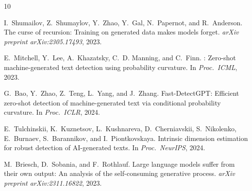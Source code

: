 \documentclass[letterpaper,11pt]{article}
\begin{document}
{
\small

\begin{thebibliography}{10}

I.~Shumailov, Z.~Shumaylov, Y.~Zhao, Y.~Gal, N.~Papernot, and R.~Anderson.
\newblock The curse of recursion: Training on generated data makes models forget.
\newblock \emph{arXiv preprint arXiv:2305.17493}, 2023.

E.~Mitchell, Y.~Lee, A.~Khazatsky, C.~D. Manning, and C.~Finn.
: Zero-shot machine-generated text detection using probability curvature.
\newblock In \emph{Proc.\ ICML}, 2023.

G.~Bao, Y.~Zhao, Z.~Teng, L.~Yang, and J.~Zhang.
\newblock Fast-{DetectGPT}: Efficient zero-shot detection of machine-generated text via conditional probability curvature.
\newblock In \emph{Proc.\ ICLR}, 2024.

E.~Tulchinskii, K.~Kuznetsov, L.~Kushnareva, D.~Cherniavskii, S.~Nikolenko, E.~Burnaev, S.~Barannikov, and I.~Piontkovskaya.
\newblock Intrinsic dimension estimation for robust detection of {AI}-generated texts.
\newblock In \emph{Proc.\ NeurIPS}, 2024.

M.~Briesch, D.~Sobania, and F.~Rothlauf.
\newblock Large language models suffer from their own output: An analysis of the self-consuming generative process.
\newblock \emph{arXiv preprint arXiv:2311.16822}, 2023.

\end{thebibliography}
}
\end{document}
